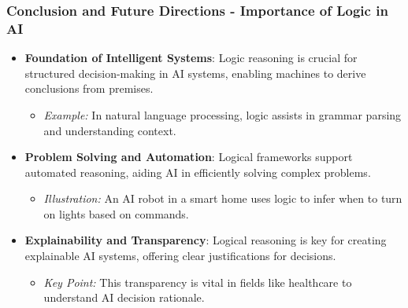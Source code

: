 \documentclass[aspectratio=169]{beamer}
\begin{document}
\begin{frame}[fragile]
    \frametitle{Conclusion and Future Directions - Importance of Logic in AI}
    \begin{itemize}
        \item \textbf{Foundation of Intelligent Systems}:
        Logic reasoning is crucial for structured decision-making in AI systems, enabling machines to derive conclusions from premises.
        \begin{itemize}
            \item \textit{Example:} In natural language processing, logic assists in grammar parsing and understanding context.
        \end{itemize}
        
        \item \textbf{Problem Solving and Automation}:
        Logical frameworks support automated reasoning, aiding AI in efficiently solving complex problems.
        \begin{itemize}
            \item \textit{Illustration:} An AI robot in a smart home uses logic to infer when to turn on lights based on commands.
        \end{itemize}
        
        \item \textbf{Explainability and Transparency}:
        Logical reasoning is key for creating explainable AI systems, offering clear justifications for decisions.
        \begin{itemize}
            \item \textit{Key Point:} This transparency is vital in fields like healthcare to understand AI decision rationale.
        \end{itemize}
    \end{itemize}
\end{frame}
\end{document}

